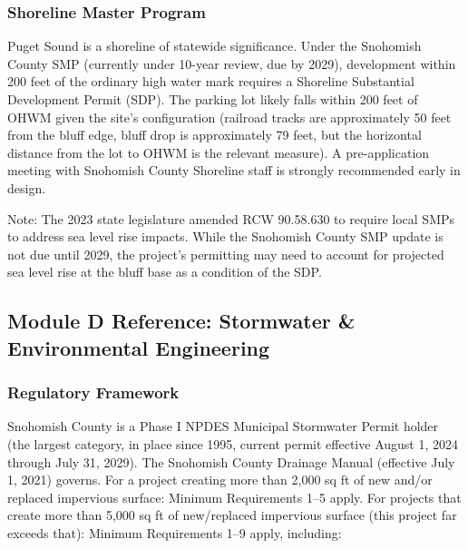 \documentclass[11pt,letterpaper]{article}
\begin{document}
\subsubsection{Shoreline Master Program}

Puget Sound is a shoreline of statewide significance. Under the Snohomish County SMP (currently under 10-year review, due by 2029), development within 200 feet of the ordinary high water mark requires a Shoreline Substantial Development Permit (SDP). The parking lot likely falls within 200 feet of OHWM given the site's configuration (railroad tracks are approximately 50 feet from the bluff edge, bluff drop is approximately 79 feet, but the horizontal distance from the lot to OHWM is the relevant measure). A pre-application meeting with Snohomish County Shoreline staff is strongly recommended early in design.

Note: The 2023 state legislature amended RCW 90.58.630 to require local SMPs to address sea level rise impacts. While the Snohomish County SMP update is not due until 2029, the project's permitting may need to account for projected sea level rise at the bluff base as a condition of the SDP.

\subsection{Module D Reference: Stormwater \& Environmental Engineering}

\subsubsection{Regulatory Framework}

Snohomish County is a Phase I NPDES Municipal Stormwater Permit holder (the largest category, in place since 1995, current permit effective August 1, 2024 through July 31, 2029). The Snohomish County Drainage Manual (effective July 1, 2021) governs. For a project creating more than 2,000 sq ft of new and/or replaced impervious surface: Minimum Requirements 1--5 apply. For projects that create more than 5,000 sq ft of new/replaced impervious surface (this project far exceeds that): Minimum Requirements 1--9 apply, including:
\end{document}
